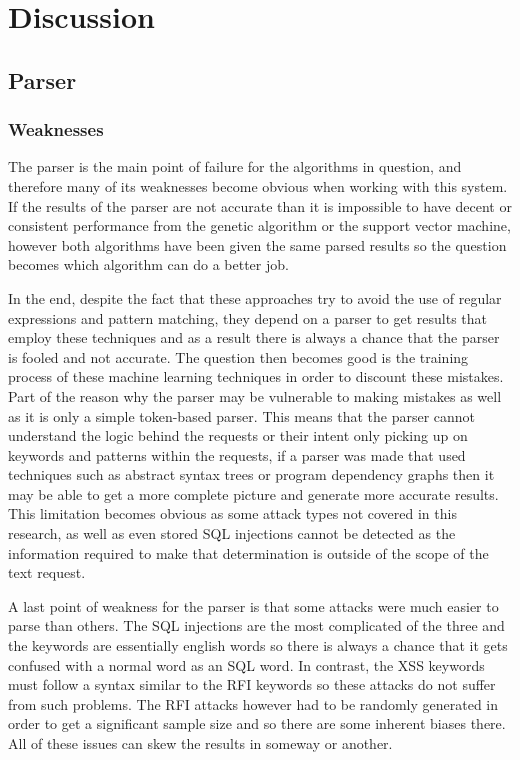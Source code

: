 \chapter{Discussion}

\section{Parser}

\subsection{Weaknesses}\label{sec:parseWeak}

The parser is the main point of failure for the algorithms in question, and therefore many of its weaknesses become obvious when working with this system.  If the results of the parser are not accurate than it is impossible to have decent or consistent performance from the genetic algorithm or the support vector machine, however both algorithms have been given the same parsed results so the question becomes which algorithm can do a better job.  

In the end, despite the fact that these approaches try to avoid the use of regular expressions and pattern matching, they depend on a parser to get results that employ these techniques and as a result there is always a chance that the parser is fooled and not accurate.  The question then becomes good is the training process of these machine learning techniques in order to discount these mistakes.  Part of the reason why the parser may be vulnerable to making mistakes as well as it is only a simple token-based parser.  This means that the parser cannot understand the logic behind the requests or their intent only picking up on keywords and patterns within the requests, if a parser was made that used techniques such as abstract syntax trees or program dependency graphs then it may be able to get a more complete picture and generate more accurate results.  This limitation becomes obvious as some attack types not covered in this research, as well as even stored SQL injections cannot be detected as the information required to make that determination is outside of the scope of the text request.

A last point of weakness for the parser is that some attacks were much easier to parse than others.  The SQL injections are the most complicated of the three and the keywords are essentially english words so there is always a chance that it gets confused with a normal word as an SQL word.  In contrast, the XSS keywords must follow a syntax similar to the RFI keywords so these attacks do not suffer from such problems.  The RFI attacks however had to be randomly generated in order to get a significant sample size and so there are some inherent biases there.  All of these issues can skew the results in someway or another.

